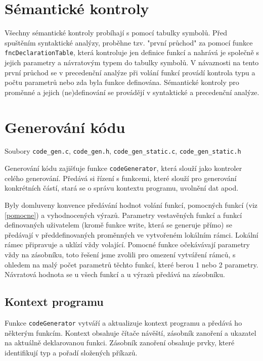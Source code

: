 \documentclass[a4paper, 12pt]{article}
\begin{document}
    \section{Sémantické kontroly}
    Všechny sémantické kontroly probíhají s pomocí tabulky symbolů. Před spuštěním syntaktické analýzy, proběhne tzv. "první průchod" za pomocí funkce \texttt{fncDeclarationTable}, která kontroluje jen definice funkcí a nahrává je společně s jejich parametry a návratovým typem do tabulky symbolů. V návaznosti na tento první průchod se v precedenční analýze při volání funkcí provádí kontrola typu a počtu parametrů nebo zda byla funkce definována. Sémantické kontroly pro proměnné a jejich (ne)definování se provádějí v syntaktické a precedenční analýze.

    \section{Generování kódu} \label{generovani}
    Soubory \texttt{code\_gen.c}, \texttt{code\_gen.h}, \texttt{code\_gen\_static.c}, \texttt{code\_gen\_static.h}
    
    Generování kódu zajišťuje funkce \texttt{codeGenerator}, která slouží jako kontroler celého generování. Předává si řízení s funkcemi, které slouží pro generování konkrétních částí, stará se o správu kontextu programu, uvolnění dat apod.

    Byly domluveny konvence předávání hodnot volání funkcí, pomocných funkcí (viz \ref{pomocne}) a vyhodnocených výrazů. Parametry vestavěných funkcí a funkcí definovaných uživatelem (kromě funkce write, která se generuje přímo) se předávají v předdefinovaných proměnných ve vytvořeném lokálním rámci. Lokální rámec připravuje a uklízí vždy volající. Pomocné funkce očekávávají parametry vždy na zásobníku, toto řešení jsme zvolili pro omezení vytváření rámců, s ohledem na malý počet parametrů těchto funkcí, které berou 1 nebo 2 parametry. Návratová hodnota se u všech funkcí a u výrazů předává na zásobníku.

    \subsection{Kontext programu}
    Funkce \texttt{codeGenerator} vytváří a aktualizuje kontext programu a předává ho některým funkcím. Kontext obsahuje čítače návěští, zásobník zanoření a ukazatel na aktuálně deklarovanou funkci. Zásobník zanoření obsahuje prvky, které identifikují typ a pořadí složených příkazů.
\end{document}
